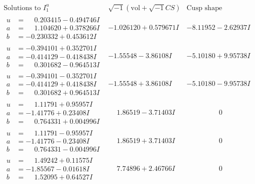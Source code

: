 \documentclass[1p]{elsarticle_modified}
\theoremstyle{definition}
\newcommand{\I}{\sqrt{-1}}
\begin{document}
$$\begin{array}{c|c|c}
 \end{array}$$\newpage$$\begin{array}{c|c|c}  
\text{Solutions to }I^u_{1}& \I (\text{vol} + \sqrt{-1}CS) & \text{Cusp shape}\\
 \hline 
\begin{aligned}
u &= \phantom{-}0.203415 - 0.494746 I \\
a &= \phantom{-}1.104620 + 0.378266 I \\
b &= -0.230332 + 0.453612 I\end{aligned}
 & -1.026120 + 0.579671 I & -8.11952 - 2.62937 I \\ \hline\begin{aligned}
u &= -0.394101 + 0.352701 I \\
a &= -0.414129 - 0.418438 I \\
b &= \phantom{-}0.301682 - 0.964513 I\end{aligned}
 & -1.55548 - 3.86108 I & -5.10180 + 9.95738 I \\ \hline\begin{aligned}
u &= -0.394101 - 0.352701 I \\
a &= -0.414129 + 0.418438 I \\
b &= \phantom{-}0.301682 + 0.964513 I\end{aligned}
 & -1.55548 + 3.86108 I & -5.10180 - 9.95738 I \\ \hline\begin{aligned}
u &= \phantom{-}1.11791 + 0.95957 I \\
a &= -1.41776 + 0.23408 I \\
b &= \phantom{-}0.764331 + 0.004996 I\end{aligned}
 & \phantom{-}1.86519 - 3.71403 I & \phantom{-0.000000 } 0 \\ \hline\begin{aligned}
u &= \phantom{-}1.11791 - 0.95957 I \\
a &= -1.41776 - 0.23408 I \\
b &= \phantom{-}0.764331 - 0.004996 I\end{aligned}
 & \phantom{-}1.86519 + 3.71403 I & \phantom{-0.000000 } 0 \\ \hline\begin{aligned}
u &= \phantom{-}1.49242 + 0.11575 I \\
a &= -1.85567 - 0.01618 I \\
b &= \phantom{-}1.52095 + 0.64527 I\end{aligned}
 & \phantom{-}7.74896 + 2.46766 I & \phantom{-0.000000 } 0 \\ \hline\begin{aligned}

\end{aligned}
\end{array}$$
\end{document}
